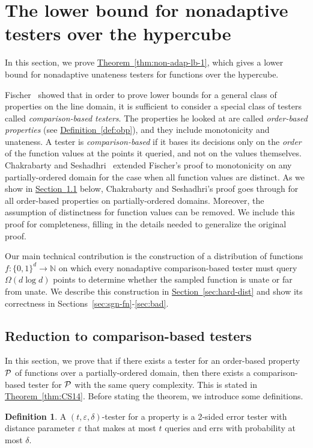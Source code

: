 \documentclass[11pt]{article}
\numberwithin{equation}{section}
\theoremstyle{definition}
\newtheorem{definition}[theorem]{Definition}
\theoremstyle{plain}
\newcommand{\N}{\mathbb N}
\newcommand{\expref}[2]{\hyperref[#2]{#1~\ref{#2}}}
\newcommand{\eps}{\varepsilon}
\newcommand{\Sec}[1]{\expref{Section}{sec:#1}}
\newcommand{\Thm}[1]{\expref{Theorem}{thm:#1}}
\newcommand{\Def}[1]{\expref{Definition}{def:#1}}
\begin{document}
\section{The lower bound for nonadaptive testers over the hypercube} \label{sec:lb}
In this section, we prove \Thm{non-adap-lb-1}, which gives a lower bound for nonadaptive unateness testers for functions over the hypercube.

Fischer~\cite{Fis04} showed that in order to prove lower bounds for a general class of properties on the line domain, it is sufficient to consider a special class of testers called \emph{comparison-based testers}. The properties he looked at are called \emph{order-based properties} (see \Def{obp}), and they include monotonicity and unateness.
A tester is \emph{comparison-based} if it bases its decisions only on the \emph{order} of the function values at the points it queried,  and not on the values themselves.
Chakrabarty and Seshadhri~\cite{CS14} extended Fischer's proof to monotonicity on any partially-ordered domain for the case when all function values are distinct. As we show in \Sec{reduction-cbt} below, Chakrabarty and Seshadhri's proof goes through for all order-based properties on partially-ordered domains. Moreover, the assumption of distinctness for function values can be removed. We include this proof for completeness, filling in the details needed to generalize the original proof.

Our main technical contribution is the construction of a distribution of functions $f:\{0,1\}^d \to \N$ on which every nonadaptive comparison-based tester must query $\Omega(d \log d)$ points to determine whether the sampled function is unate or far from unate.
We describe this construction in \Sec{hard-dist} and show its correctness in Sections~\ref{sec:sgn-fn}-\ref{sec:bad}.

\subsection{Reduction to comparison-based testers}\label{sec:reduction-cbt}
In this section, we prove that if there exists a tester for an order-based property ${\cal P}$ of functions over a partially-ordered domain, then there exists a comparison-based tester for ${\cal P}$ with the same query complexity. This is stated in \Thm{CS14}.
Before stating the theorem, we introduce some definitions.

\begin{definition} \label{def:t-eps-del-tester}
A $(t,\eps,\delta)$-tester for a property is a 2-sided error tester with distance parameter $\eps$ that makes at most $t$ queries and errs with probability at most $\delta$.
\end{definition}
\end{document}
